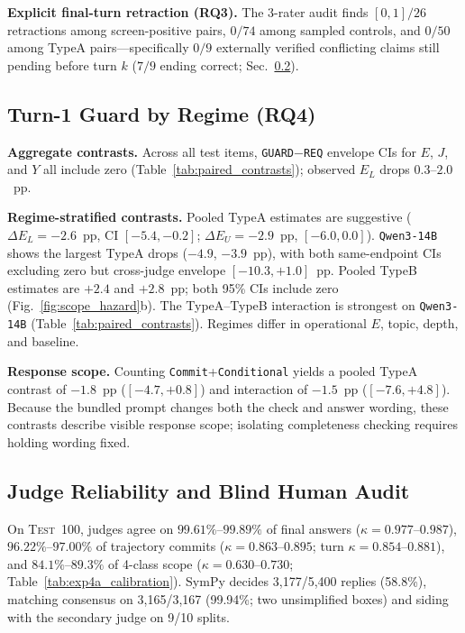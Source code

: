 \documentclass[conference,letterpaper,10pt]{IEEEtran}
\newcommand{\pREQ}{\texttt{REQ}}
\newcommand{\pGRD}{\texttt{GUARD}}
\newcommand{\TA}{TypeA}
\newcommand{\TB}{TypeB}
\begin{document}
\textbf{Explicit final-turn retraction (RQ3).} The 3-rater audit finds $[0,1]/26$ retractions among screen-positive pairs, $0/74$ among sampled controls, and $0/50$ among \TA{} pairs---specifically $0/9$ externally verified conflicting claims still pending before turn $k$ ($7/9$ ending correct; Sec.~\ref{sec:exp4a}).

\subsection{Turn-1 Guard by Regime (RQ4)}\label{sec:exp4b}
\textbf{Aggregate contrasts.} Across all test items, \pGRD$-$\pREQ{} envelope CIs for $E$, $J$, and $Y$ all include zero (Table~\ref{tab:paired_contrasts}); observed $E_L$ drops $0.3$--$2.0$~pp.

\textbf{Regime-stratified contrasts.} Pooled \TA{} estimates are suggestive ($\Delta E_L=-2.6$~pp, CI $[-5.4,-0.2]$; $\Delta E_U=-2.9$~pp, $[-6.0,0.0]$). \texttt{Qwen3-14B} shows the largest \TA{} drops ($-4.9$, $-3.9$~pp), with both same-endpoint CIs excluding zero but cross-judge envelope $[-10.3,+1.0]$~pp. Pooled \TB{} estimates are $+2.4$ and $+2.8$~pp; both 95\% CIs include zero (Fig.~\ref{fig:scope_hazard}b). The \TA--\TB{} interaction is strongest on \texttt{Qwen3-14B} (Table~\ref{tab:paired_contrasts}). Regimes differ in operational $E$, topic, depth, and baseline.

\textbf{Response scope.} Counting \texttt{Commit}+\texttt{Conditional} yields a pooled \TA{} contrast of $-1.8$~pp ($[-4.7,+0.8]$) and interaction of $-1.5$~pp ($[-7.6,+4.8]$). Because the bundled prompt changes both the check and answer wording, these contrasts describe visible response scope; isolating completeness checking requires holding wording fixed.



\subsection{Judge Reliability and Blind Human Audit}\label{sec:exp4a}
On \textsc{Test}~100, judges agree on $99.61\%$--$99.89\%$ of final answers ($\kappa{=}0.977$--$0.987$), $96.22\%$--$97.00\%$ of trajectory commits ($\kappa{=}0.863$--$0.895$; turn $\kappa{=}0.854$--$0.881$), and $84.1\%$--$89.3\%$ of 4-class scope ($\kappa{=}0.630$--$0.730$; Table~\ref{tab:exp4a_calibration}). SymPy decides 3,177/5,400 replies (58.8\%), matching consensus on 3,165/3,167 (99.94\%; two unsimplified boxes) and siding with the secondary judge on 9/10 splits.
\end{document}
